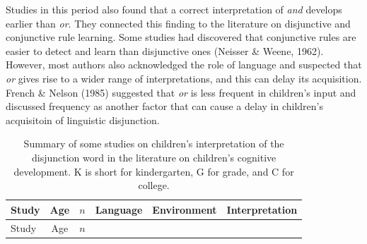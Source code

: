 \documentclass[oneside]{report}
\theoremstyle{definition}
\theoremstyle{definition}
\theoremstyle{definition}
\theoremstyle{remark}
\begin{document}
Studies in this period also found that a correct interpretation of
\emph{and} develops earlier than \emph{or}. They connected this finding
to the literature on disjunctive and conjunctive rule learning. Some
studies had discovered that conjunctive rules are easier to detect and
learn than disjunctive ones (Neisser \& Weene, 1962). However, most
authors also acknowledged the role of language and suspected that
\emph{or} gives rise to a wider range of interpretations, and this can
delay its acquisition. French \& Nelson (1985) suggested that \emph{or}
is less frequent in children's input and discussed frequency as another
factor that can cause a delay in children's acquisitoin of linguistic
disjunction.
\begin{longtable}[]{@{}lcclcc@{}}
\caption{\label{tab:piagetable} Summary of some studies on children's
interpretation of the disjunction word in the literature on children's
cognitive development. K is short for kindergarten, G for grade, and C
for college.}\tabularnewline
\toprule
\begin{minipage}[b]{0.17\columnwidth}\raggedright\strut
Study\strut
\end{minipage} & \begin{minipage}[b]{0.09\columnwidth}\centering\strut
Age\strut
\end{minipage} & \begin{minipage}[b]{0.09\columnwidth}\centering\strut
\(n\)\strut
\end{minipage} & \begin{minipage}[b]{0.06\columnwidth}\raggedright\strut
Language\strut
\end{minipage} & \begin{minipage}[b]{0.31\columnwidth}\centering\strut
Environment\strut
\end{minipage} & \begin{minipage}[b]{0.12\columnwidth}\centering\strut
Interpretation\strut
\end{minipage}\tabularnewline
\midrule
\endfirsthead
\toprule
\begin{minipage}[b]{0.17\columnwidth}\raggedright\strut
Study\strut
\end{minipage} & \begin{minipage}[b]{0.09\columnwidth}\centering\strut
Age\strut
\end{minipage} & \begin{minipage}[b]{0.09\columnwidth}\centering\strut
\(n\)\strut
\end{minipage} & \begin{minipage}[b]{0.06\columnwidth}\raggedright\strut

\end{minipage}
\end{longtable}
\end{document}
